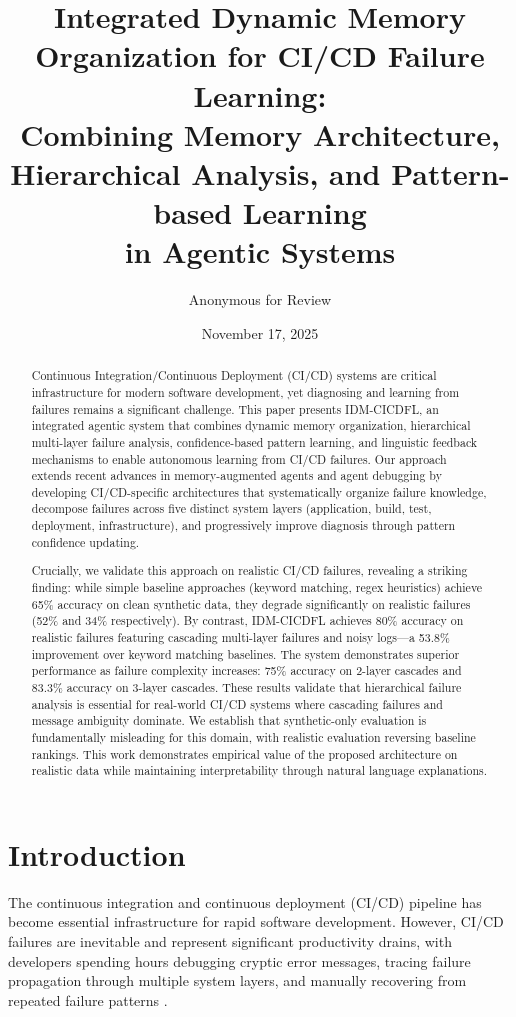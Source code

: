 \documentclass[11pt]{article}
\title{Integrated Dynamic Memory Organization for CI/CD Failure Learning: \\
        Combining Memory Architecture, Hierarchical Analysis, and Pattern-based Learning \\
        in Agentic Systems}
\author{Anonymous for Review}
\date{November 17, 2025}
\begin{document}
\maketitle

\begin{abstract}
Continuous Integration/Continuous Deployment (CI/CD) systems are critical infrastructure for modern software development, yet diagnosing and learning from failures remains a significant challenge. This paper presents IDM-CICDFL, an integrated agentic system that combines dynamic memory organization, hierarchical multi-layer failure analysis, confidence-based pattern learning, and linguistic feedback mechanisms to enable autonomous learning from CI/CD failures. Our approach extends recent advances in memory-augmented agents and agent debugging by developing CI/CD-specific architectures that systematically organize failure knowledge, decompose failures across five distinct system layers (application, build, test, deployment, infrastructure), and progressively improve diagnosis through pattern confidence updating.

Crucially, we validate this approach on realistic CI/CD failures, revealing a striking finding: while simple baseline approaches (keyword matching, regex heuristics) achieve 65\% accuracy on clean synthetic data, they degrade significantly on realistic failures (52\% and 34\% respectively). By contrast, IDM-CICDFL achieves 80\% accuracy on realistic failures featuring cascading multi-layer failures and noisy logs—a 53.8\% improvement over keyword matching baselines. The system demonstrates superior performance as failure complexity increases: 75\% accuracy on 2-layer cascades and 83.3\% accuracy on 3-layer cascades. These results validate that hierarchical failure analysis is essential for real-world CI/CD systems where cascading failures and message ambiguity dominate. We establish that synthetic-only evaluation is fundamentally misleading for this domain, with realistic evaluation reversing baseline rankings. This work demonstrates empirical value of the proposed architecture on realistic data while maintaining interpretability through natural language explanations.
\end{abstract}

\section{Introduction}

The continuous integration and continuous deployment (CI/CD) pipeline has become essential infrastructure for rapid software development. However, CI/CD failures are inevitable and represent significant productivity drains, with developers spending hours debugging cryptic error messages, tracing failure propagation through multiple system layers, and manually recovering from repeated failure patterns \citep{Vasallo2019}.
\end{document}
